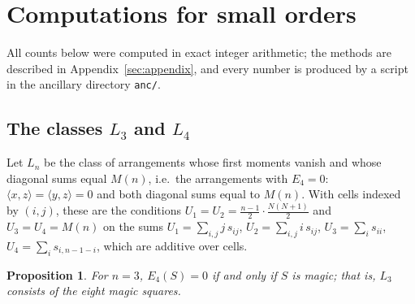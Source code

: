 \documentclass[11pt,a4paper]{article}
\theoremstyle{plain}
\newtheorem{proposition}[theorem]{Proposition}
\theoremstyle{definition}
\theoremstyle{remark}
\newcommand{\Efour}{E_4}
\begin{document}
\section{Computations for small orders}
\label{sec:computations}

All counts below were computed in exact integer arithmetic; the methods are described in Appendix~\ref{sec:appendix}, and every number is produced by a script in the ancillary directory \texttt{anc/}.

\subsection{The classes \texorpdfstring{$L_3$}{L3} and \texorpdfstring{$L_4$}{L4}}
\label{sec:lowmode_n4}

Let $L_n$ be the class of arrangements whose first moments vanish and whose diagonal sums equal $M(n)$, i.e.\ the arrangements with $\Efour=0$: $\langle x,z\rangle=\langle y,z\rangle=0$ and both diagonal sums equal to $M(n)$.
With cells indexed by $(i,j)$, these are the conditions $U_1=U_2=\frac{n-1}2\cdot\frac{N(N+1)}2$ and $U_3=U_4=M(n)$ on the sums
$U_1=\sum_{i,j}j\,s_{ij}$, $U_2=\sum_{i,j}i\,s_{ij}$, $U_3=\sum_is_{ii}$, $U_4=\sum_is_{i,n-1-i}$, which are additive over cells.

\begin{proposition}
\label{prop:n3_lowmode}
For $n=3$, $\Efour(S)=0$ if and only if $S$ is magic; that is, $L_3$ consists of the eight magic squares.
\end{proposition}
\end{document}
